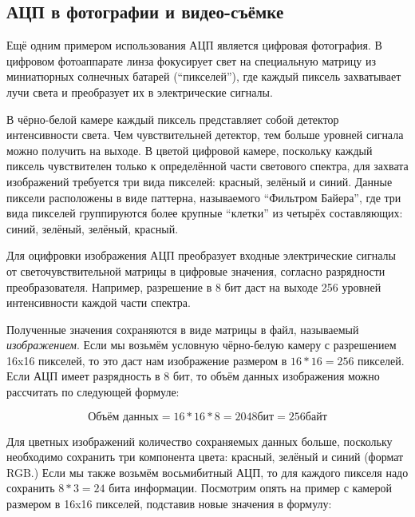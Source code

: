 \documentclass[../sparc.tex]{subfiles}
\begin{document}
\subsection{АЦП в фотографии и видео-съёмке}


Ещё одним примером использования \gls{АЦП} является цифровая фотография.  В
цифровом фотоаппарате линза фокусирует свет на специальную матрицу из
миниатюрных солнечных батарей (``пикселей''), где каждый пиксель захватывает
лучи света и преобразует их в электрические сигналы. \cite{expertphotography}

В чёрно-белой камере каждый пиксель представляет собой детектор интенсивности
света.  Чем чувствительней детектор, тем больше уровней сигнала можно получить
на выходе.  В цветой цифровой камере, поскольку каждый пиксель чувствителен
только к определённой части светового спектра, для захвата изображений требуется
три вида пикселей: красный, зелёный и синий.  Данные пиксели расположены в виде
паттерна, называемого ``Фильтром Байера'', где три вида пикселей группируются
более крупные ``клетки'' из четырёх составляющих: синий, зелёный, зелёный,
красный.

Для оцифровки изображения АЦП преобразует входные электрические сигналы от
светочувствительной матрицы в цифровые значения, согласно разрядности
преобразователя.  Например, разрешение в 8 бит даст на выходе 256 уровней
интенсивности каждой части спектра.

Полученные значения сохраняются в виде матрицы в файл, называемый
\emph{изображением}.  Если мы возьмём условную чёрно-белую камеру с разрешением
16x16 пикселей, то это даст нам изображение размером в $16 * 16 = 256$ пикселей.
Если АЦП имеет разрядность в 8 бит, то объём данных изображения можно рассчитать
по следующей формуле:

\begin{equation}
  \mbox{Объём данных} = 16 * 16 * 8 = 2048 \mbox{бит} = 256 \mbox{байт}
  \label{equation:adc-image-0}
\end{equation}

Для цветных изображений количество сохраняемых данных больше, поскольку
необходимо сохранить три компонента цвета: красный, зелёный и синий (формат
RGB.)  Если мы также возьмём восьмибитный АЦП, то для каждого пикселя надо
сохранить $8 * 3 = 24$ бита информации.  Посмотрим опять на пример с камерой
размером в 16x16 пикселей, подставив новые значения в формулу:
\end{document}
